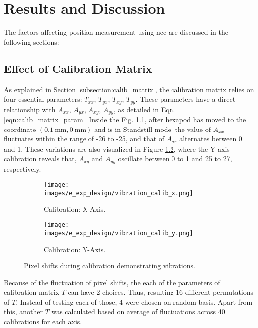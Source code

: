 \chapter{Results and Discussion} \label{chap:results_and_discussion}

The factors affecting position measurement using \gls{ncc} are discussed in the following sections:

\section{Effect of Calibration Matrix}
As explained in Section \ref{subsection:calib_matrix}, the calibration matrix relies on four essential parameters: $T_{xx}$, $T_{yx}$, $T_{xy}$, $T_{yy}$. These parameters have a direct relationship with $A_{xx}$, $A_{yx}$, $A_{xy}$, $A_{yy}$, as detailed in Eqn. \ref{eqn:calib_matrix_param}. Inside the Fig. \ref{fig:vibration_calib_x.png}, after hexapod has moved to the coordinate $(\SI{0.1}{\milli\meter}, \SI{0}{\milli\meter})$ and is in \textsf{Standstill} mode, the value of $A_{xx}$ fluctuates within the range of -26 to -25, and that of $A_{yx}$ alternates between 0 and 1. These variations are also visualized in Figure \ref{fig:vibration_calib_y.png}, where the Y-axis calibration reveals that, $A_{xy}$ and $A_{yy}$ oscillate between 0 to 1 and 25 to 27, respectively.  

\begin{figure}[h]
    \centering
    \begin{subfigure}{0.49\textwidth}
        \centering
        \texttt{[image: images/e\_exp\_design/vibration\_calib\_x.png]}
        \caption{Calibration: X-Axis.}
        \label{fig:vibration_calib_x.png}
    \end{subfigure}
    \begin{subfigure}{0.49\textwidth}
        \centering
        \texttt{[image: images/e\_exp\_design/vibration\_calib\_y.png]}
        \caption{Calibration: Y-Axis.}
        \label{fig:vibration_calib_y.png}
    \end{subfigure}
    \caption{Pixel shifts during calibration demonstrating vibrations.}
    \label{fig:vibration}
\end{figure}

\noindent Because of the fluctuation of pixel shifts, the each of the parameters of calibration matrix $T$ can have 2 choices. Thus, resulting 16 different permutations of $T$. Instead of testing each of those, 4 were chosen on random basis. Apart from this, another $T$ was calculated based on average of fluctuations across 40 calibrations for each axis.

